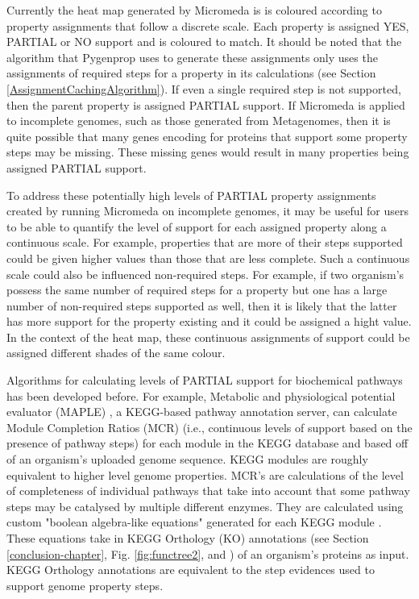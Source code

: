 Currently the heat map generated by Micromeda is is coloured according to property assignments that follow a discrete scale. Each property is assigned YES, PARTIAL or NO support and is coloured to match. It should be noted that the algorithm that Pygenprop uses to generate these assignments only uses the assignments of required steps for a property in its calculations (see Section \ref{AssignmentCachingAlgorithm}). If even a single required step is not supported, then the parent property is assigned PARTIAL support. If Micromeda is applied to incomplete genomes, such as those generated from Metagenomes, then it is quite possible that many genes encoding for proteins that support some property steps may be missing. These missing genes would result in many properties being assigned PARTIAL support. 

To address these potentially high levels of PARTIAL property assignments created by running Micromeda on incomplete genomes, it may be useful for users to be able to quantify the level of support for each assigned property along a continuous scale. For example, properties that are more of their steps supported could be given higher values than those that are less complete. Such a continuous scale could also be influenced non-required steps. For example, if two organism's possess the same number of required steps for a property but one has a large number of non-required steps supported as well, then it is likely that the latter has more support for the property existing and it could be assigned a hight value. In the context of the heat map, these continuous assignments of support could be assigned different shades of the same colour.

Algorithms for calculating levels of PARTIAL support for biochemical pathways has been developed before. For example, Metabolic and physiological potential evaluator (MAPLE) \cite{takami2016automated}, a KEGG-based pathway annotation server, can calculate Module Completion Ratios (MCR) (i.e., continuous levels of support based on the presence of pathway steps) for each module in the KEGG database and based off of an organism's uploaded genome sequence. KEGG modules are roughly equivalent to higher level genome properties. MCR's are calculations of the level of completeness of individual pathways that take into account that some pathway steps may be catalysed by multiple different enzymes. They are calculated using custom "boolean algebra-like equations" generated for each KEGG module \cite{takami2012evaluation}. These equations take in KEGG Orthology (KO) annotations (see Section \ref{conclusion-chapter}, Fig. \ref{fig:functree2}, and \cite{mao2005automated}) of an organism's proteins as input. KEGG Orthology annotations are equivalent to the step evidences used to support genome property steps. 

